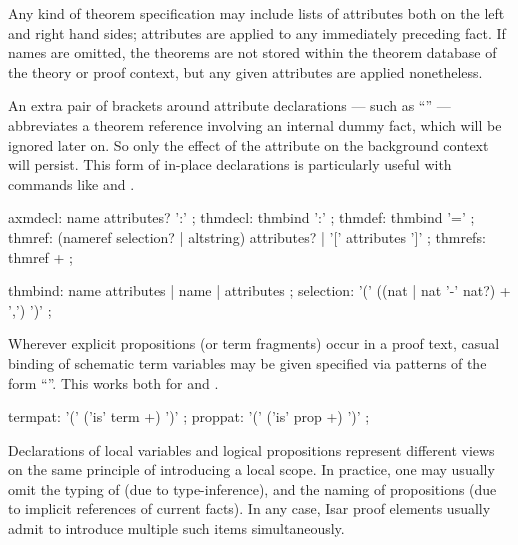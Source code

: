 \begin{isabellebody}
\begin{isamarkuptext}
  Any kind of theorem specification may include lists of attributes
  both on the left and right hand sides; attributes are applied to any
  immediately preceding fact.  If names are omitted, the theorems are
  not stored within the theorem database of the theory or proof
  context, but any given attributes are applied nonetheless.

  An extra pair of brackets around attribute declarations --- such as
  ``'' --- abbreviates a theorem reference
  involving an internal dummy fact, which will be ignored later on.
  So only the effect of the attribute on the background context will
  persist.  This form of in-place declarations is particularly useful
  with commands like  and .

  \begin{rail}
    axmdecl: name attributes? ':'
    ;
    thmdecl: thmbind ':'
    ;
    thmdef: thmbind '='
    ;
    thmref: (nameref selection? | altstring) attributes? | '[' attributes ']'
    ;
    thmrefs: thmref +
    ;

    thmbind: name attributes | name | attributes
    ;
    selection: '(' ((nat | nat '-' nat?) + ',') ')'
    ;
  \end{rail}%
\end{isamarkuptext}%
\isamarkuptrue%
%
\isamarkuptrue%
%
\begin{isamarkuptext}%
Wherever explicit propositions (or term fragments) occur in a proof
  text, casual binding of schematic term variables may be given
  specified via patterns of the form ``''.  This works both for  and .

  \begin{rail}
    termpat: '(' ('is' term +) ')'
    ;
    proppat: '(' ('is' prop +) ')'
    ;
  \end{rail}

  \medskip Declarations of local variables  and
  logical propositions  represent different views on
  the same principle of introducing a local scope.  In practice, one
  may usually omit the typing of  (due to
  type-inference), and the naming of propositions (due to implicit
  references of current facts).  In any case, Isar proof elements
  usually admit to introduce multiple such items simultaneously.


\end{isamarkuptext}
\end{isabellebody}
